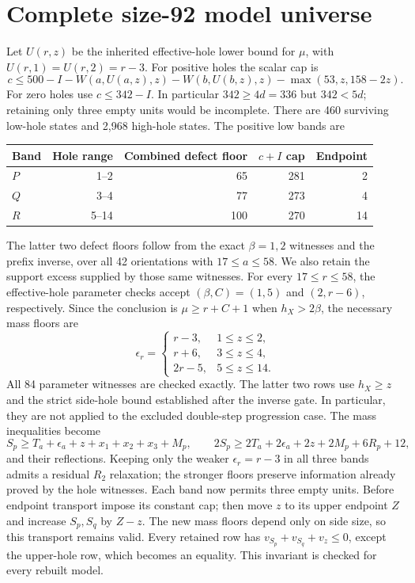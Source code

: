 \documentclass[11pt,a4paper]{article}
\begin{document}
\section{Complete size-92 model universe}
Let $U(r,z)$ be the inherited effective-hole lower bound for $\mu$,
with $U(r,1)=U(r,2)=r-3$. For positive holes the scalar cap is
\[
 c\le500-I-W(a,U(a,z),z)-W(b,U(b,z),z)-\max(53,z,158-2z).
\]
For zero holes use $c\le342-I$. In particular $342\ge4d=336$ but
$342<5d$; retaining only three empty units would be incomplete.
There are 460 surviving low-hole states and 2,968 high-hole states.
The positive low bands are
\begin{center}
\begin{tabular}{lrrrr}\toprule
Band&Hole range&Combined defect floor&$c+I$ cap&Endpoint\\\midrule
$P$&1--2&65&281&2\\
$Q$&3--4&77&273&4\\
$R$&5--14&100&270&14\\\bottomrule
\end{tabular}
\end{center}
The latter two defect floors follow from the exact $\beta=1,2$ witnesses
and the prefix inverse, over all 42 orientations with $17\le a\le58$.
We also retain the support excess supplied by those same witnesses.
For every $17\le r\le58$, the effective-hole parameter checks accept
$(\beta,C)=(1,5)$ and $(2,r-6)$, respectively. Since the conclusion is
$\mu\ge r+C+1$ when $h_X>2\beta$, the necessary mass floors are
\[
 \epsilon_r=\begin{cases}
 r-3,&1\le z\le2,\\
 r+6,&3\le z\le4,\\
 2r-5,&5\le z\le14.
 \end{cases}
\]
All 84 parameter witnesses are checked exactly. The latter two rows
use $h_X\ge z$ and the strict side-hole bound established after the
inverse gate. In particular, they are not applied to the excluded
double-step progression case. The mass inequalities become
\[
 S_p\ge T_a+\epsilon_a+z+x_1+x_2+x_3+M_p,
 \qquad 2S_p\ge2T_a+2\epsilon_a+2z+2M_p+6R_p+12,
\]
and their reflections. Keeping only the weaker $\epsilon_r=r-3$
in all three bands admits a residual $R_2$ relaxation; the stronger
floors preserve information already proved by the hole witnesses.
Each band now permits three empty units. Before endpoint transport
impose its constant cap; then move $z$ to its upper endpoint $Z$ and
increase $S_p,S_q$ by $Z-z$. The new mass floors depend only on side
size, so this transport remains valid. Every retained row has
$v_{S_p}+v_{S_q}+v_z\le0$, except the upper-hole row, which becomes
an equality. This invariant is checked for every rebuilt model.
\end{document}
